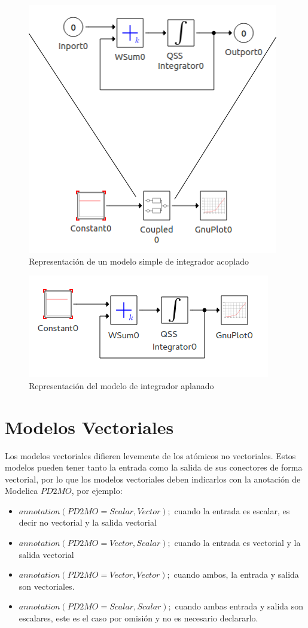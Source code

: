 \begin{figure}[H]
\centering
 \includegraphics[width=0.5\linewidth]{integrator-sample}
 \caption{Representación de un modelo simple de integrador acoplado}
 \label{fig:acomplado}
\end{figure}


\begin{figure}[H]
\centering
 \includegraphics[width=0.5\linewidth]{integrator-expanded}
 \caption{Representación del modelo de integrador aplanado }
 \label{fig:aplanado}
\end{figure}



\section{Modelos Vectoriales}
Los modelos vectoriales difieren levemente de los atómicos no vectoriales. Estos modelos pueden tener tanto la entrada como la salida de sus conectores de forma vectorial, por lo que los modelos vectoriales deben indicarlos con la anotación de Modelica $PD2MO$, por ejemplo:
\begin{itemize}
\item $annotation(PD2MO = {Scalar, Vector});$ cuando la entrada es escalar, es decir no vectorial y la salida vectorial
\item $annotation(PD2MO = {Vector, Scalar});$ cuando la entrada es vectorial y la salida vectorial
\item $annotation(PD2MO = {Vector, Vector});$ cuando ambos, la entrada y salida son vectoriales.
\item $annotation(PD2MO = {Scalar, Scalar});$ cuando ambas entrada y salida son escalares, este es el caso por omisión y no es necesario declararlo.
\end{itemize}

